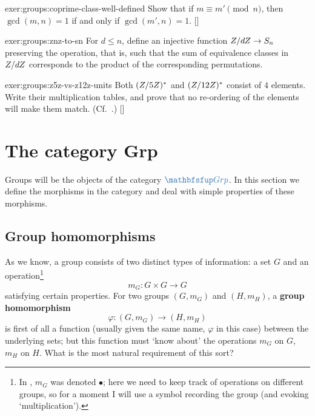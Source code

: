 \begin{exer}{\exerused}{exer:groups:coprime-class-well-defined}
  Show that if $m \equiv m' \pmod{n}$, then $\gcd(m,n) = 1$ if and
  only if $\gcd(m',n) =
  1$. []
\end{exer}

\begin{exer}{}{exer:groups:znz-to-sn}
  For $d \leq n$, define an injective function $Z/dZ \to S_n$
  preserving the operation, that is, such that the sum of equivalence
  classes in $Z/dZ$ corresponds to the product of the corresponding
  permutations.
\end{exer}

\begin{exer}{\exerused}{exer:groups:z5z-vs-z12z-units}
  Both $(Z/5Z)^*$ and $(Z/12Z)^*$ consist of $4$ elements. Write
  their multiplication tables, and prove that no re-ordering of the
  elements will make them match. (Cf.\
  .)
  []
\end{exer}

\section{The category Grp}%
\label{sec:groups:the-category-grp}

Groups will be the objects of the category $\categ{Grp}$. In this
section we define the morphisms in the category and deal with simple
properties of these morphisms.

\subsection{Group homomorphisms}%
\label{subsec:groups:group-homomorphisms}
As we know, a group consists of two distinct types of information: a
set $G$ and an operation\footnote{In
  , $m_G$ was denoted
  $\bullet$; here we need to keep track of operations on different
  groups, so for a moment I will use a symbol recording the group (and
  evoking `multiplication').}
\[
  m_G : G \times G \to G
\]
satisfying certain properties. For two groups $(G, m_G)$ and
$(H, m_H)$, a \textbf{group homomorphism}
\[
  \varphi : (G, m_G) \to (H, m_H)
\]
is first of all a function (usually given the same name, $\varphi$ in
this case) between the underlying sets; but this function must `know
about' the operations $m_G$ on $G$, $m_H$ on $H$. What is the most
natural requirement of this sort?

